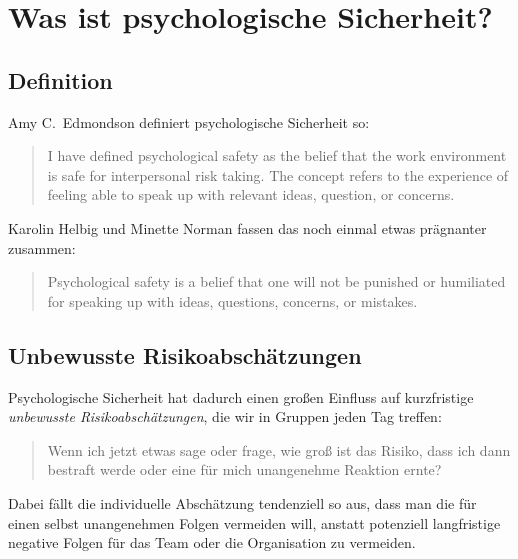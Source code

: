 \section{Was ist psychologische Sicherheit?}

\subsection{Definition}
\label{ps-definition}

Amy C.~Edmondson \cite{the-fearless-organisation} definiert psychologische Sicherheit so:

\begin{quote}
    I have defined psychological safety as the belief that the work environment is safe for interpersonal risk taking. The concept refers to the experience of feeling able to speak up with relevant ideas, question, or concerns.
\end{quote}

Karolin Helbig und Minette Norman \cite{psychological-safety-playbook} fassen das noch einmal etwas prägnanter zusammen:

\begin{quote}
    Psychological safety is a belief that one will not be punished or humiliated for speaking up with ideas, questions, concerns, or mistakes.
\end{quote}

\subsection{Unbewusste Risikoabschätzungen}

Psychologische Sicherheit hat dadurch einen großen Einfluss auf kurzfristige \emph{unbewusste Risikoabschätzungen}, die wir in Gruppen jeden Tag treffen:

\begin{quote}
    \glqq Wenn ich jetzt etwas sage oder frage, wie groß ist das Risiko, dass ich dann bestraft werde oder eine für mich unangenehme Reaktion ernte?\grqq
\end{quote}

Dabei fällt die individuelle Abschätzung tendenziell so aus, dass man die für einen selbst unangenehmen Folgen vermeiden will, anstatt potenziell langfristige negative Folgen für das Team oder die Organisation zu vermeiden.

